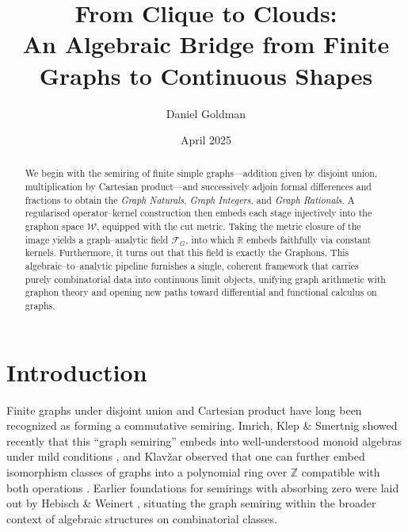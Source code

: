 \documentclass[11pt]{article}
\title{\bfseries From Clique to Clouds:\\An Algebraic Bridge from Finite Graphs to Continuous Shapes}
\author{Daniel Goldman}
\date{April 2025}
\theoremstyle{definition}
\theoremstyle{plain}
\theoremstyle{remark}
\begin{document}
\maketitle

\begin{center}
\end{center}
\vspace{1em}

\begin{abstract}
We begin with the semiring of finite simple graphs—addition given by disjoint union, multiplication by Cartesian product—and successively adjoin formal differences and fractions to obtain the \emph{Graph Naturals}, \emph{Graph Integers}, and \emph{Graph Rationals}. A regularised operator–kernel construction then embeds each stage injectively into the graphon space \(\mathcal{W}\), equipped with the cut metric. Taking the metric closure of the image yields a graph–analytic field \(\mathcal{F}_G\), into which \(\mathbb{R}\) embeds faithfully via constant kernels. Furthermore, it turns out that this field is exactly the Graphons. This algebraic–to–analytic pipeline furnishes a single, coherent framework that carries purely combinatorial data into continuous limit objects, unifying graph arithmetic with graphon theory and opening new paths toward differential and functional calculus on graphs.
\end{abstract}
\section{Introduction}

Finite graphs under disjoint union and Cartesian product have long been recognized as forming a commutative semiring.  Imrich, Klep \& Smertnig showed recently that this “graph semiring” embeds into well‑understood monoid algebras under mild conditions \cite{ImrichKlepSmertnig2024}, and Klavžar observed that one can further embed isomorphism classes of graphs into a polynomial ring over \(\mathbb{Z}\) compatible with both operations \cite{Klavzar2009}.  Earlier foundations for semirings with absorbing zero were laid out by Hebisch \& Weinert \cite{HebischWeinert1998}, situating the graph semiring within the broader context of algebraic structures on combinatorial classes.
\end{document}
